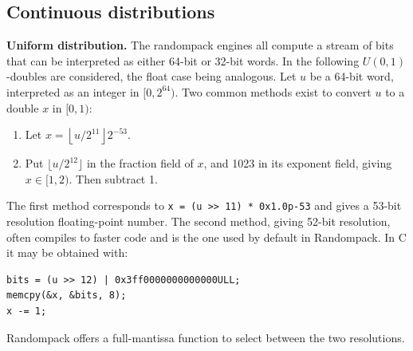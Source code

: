 \documentclass[manuscript,screen,review]{acmart}
\begin{document}
\subsection{Continuous distributions}
\textbf{Uniform distribution.} The randompack engines all compute a
stream of bits that can be interpreted as either 64-bit or 32-bit
words. In the following $U(0,1)$-doubles are considered, the float
case being analogous. Let $u$ be a 64-bit word, interpreted as an
integer in $[0,2^{64})$. Two common methods exist to convert $u$ to a
double $x$ in $[0, 1)$:
%
\begin{samepage}
\begin{enumerate}
\item Let $x = \left\lfloor u/2^{11} \right\rfloor 2^{-53}$.
\item Put $\lfloor u/2^{12}\rfloor$ in the fraction field of $x$, and 1023
in its exponent field, giving $x \in [1,2)$. Then subtract 1.
\end{enumerate}
\end{samepage}
%
The first method corresponds to \texttt{x = (u >> 11) * 0x1.0p-53} and
gives a 53-bit resolution floating-point number. The second method,
giving 52-bit resolution, often compiles to faster code and is the one
used by default in Randompack. In C it may be obtained with:
%
\begin{lstlisting}[style=tightcode]
bits = (u >> 12) | 0x3ff0000000000000ULL;
memcpy(&x, &bits, 8);
x -= 1;
\end{lstlisting}
%
Randompack offers a full-mantissa function to select between the two
resolutions.
\end{document}
